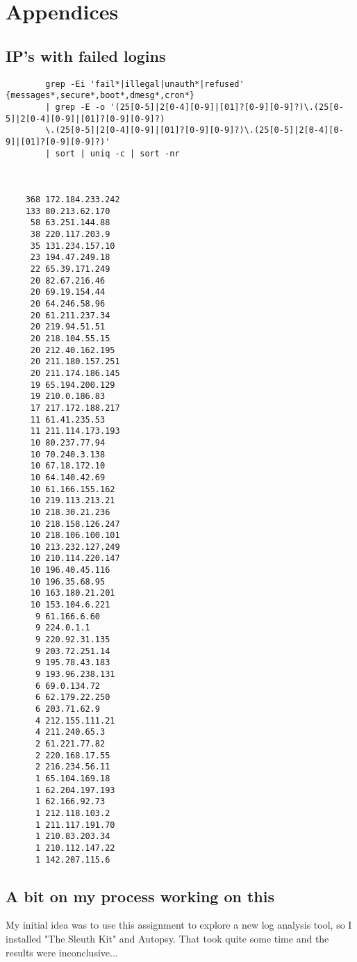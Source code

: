 \documentclass[
	letterpaper, %
	10pt, %
	unnumberedsections, %
	twoside, %
]{APAAssignment}
\begin{document}
\chapter{Appendices}
\begin{appendices}

	\section{IP's with failed logins}\label{app:numberedFailedLogons}
	\begin{verbatim}
		grep -Ei 'fail*|illegal|unauth*|refused' {messages*,secure*,boot*,dmesg*,cron*} 
		| grep -E -o '(25[0-5]|2[0-4][0-9]|[01]?[0-9][0-9]?)\.(25[0-5]|2[0-4][0-9]|[01]?[0-9][0-9]?)
		\.(25[0-5]|2[0-4][0-9]|[01]?[0-9][0-9]?)\.(25[0-5]|2[0-4][0-9]|[01]?[0-9][0-9]?)' 
		| sort | uniq -c | sort -nr



    368 172.184.233.242
    133 80.213.62.170
     58 63.251.144.88
     38 220.117.203.9
     35 131.234.157.10
     23 194.47.249.18
     22 65.39.171.249
     20 82.67.216.46
     20 69.19.154.44
     20 64.246.58.96
     20 61.211.237.34
     20 219.94.51.51
     20 218.104.55.15
     20 212.40.162.195
     20 211.180.157.251
     20 211.174.186.145
     19 65.194.200.129
     19 210.0.186.83
     17 217.172.188.217
     11 61.41.235.53
     11 211.114.173.193
     10 80.237.77.94
     10 70.240.3.138
     10 67.18.172.10
     10 64.140.42.69
     10 61.166.155.162
     10 219.113.213.21
     10 218.30.21.236
     10 218.158.126.247
     10 218.106.100.101
     10 213.232.127.249
     10 210.114.220.147
     10 196.40.45.116
     10 196.35.68.95
     10 163.180.21.201
     10 153.104.6.221
      9 61.166.6.60
      9 224.0.1.1
      9 220.92.31.135
      9 203.72.251.14
      9 195.78.43.183
      9 193.96.238.131
      6 69.0.134.72
      6 62.179.22.250
      6 203.71.62.9
      4 212.155.111.21
      4 211.240.65.3
      2 61.221.77.82
      2 220.168.17.55
      2 216.234.56.11
      1 65.104.169.18
      1 62.204.197.193
      1 62.166.92.73
      1 212.118.103.2
      1 211.117.191.70
      1 210.83.203.34
      1 210.112.147.22
      1 142.207.115.6

	\end{verbatim}

	\section{A bit on my process working on this}\label{app:process}
	My initial idea was to use this assignment to explore a new log analysis tool, so I installed "The Sleuth Kit" and Autopsy. That took quite some time and the results were inconclusive...\\


\end{appendices}
\end{document}
